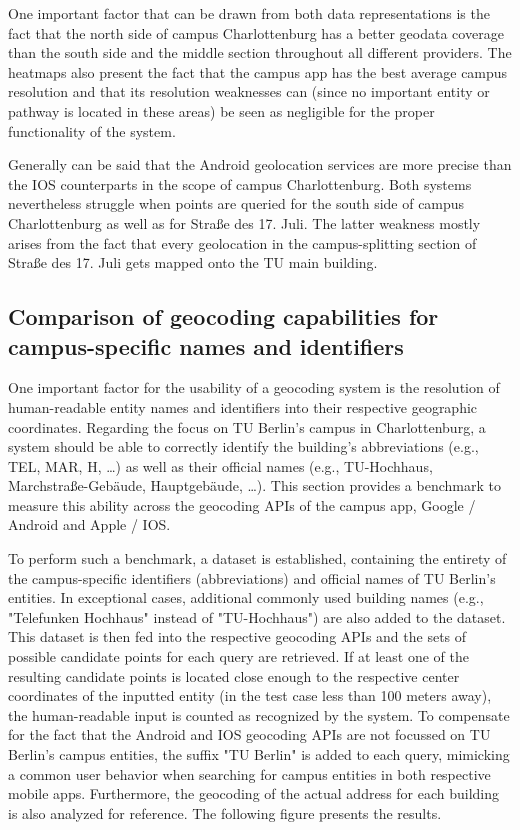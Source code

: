 One important factor that can be drawn from both data representations is the fact that the north side of campus Charlottenburg has a better geodata coverage than the south side and the middle section throughout all different providers. The heatmaps also present the fact that the campus app has the best average campus resolution and that its resolution weaknesses can (since no important entity or pathway is located in these areas) be seen as negligible for the proper functionality of the system.

Generally can be said that the Android geolocation services are more precise than the IOS counterparts in the scope of campus Charlottenburg. Both systems nevertheless struggle when points are queried for the south side of campus Charlottenburg as well as for Straße des 17. Juli. The latter weakness mostly arises from the fact that every geolocation in the campus-splitting section of Straße des 17. Juli gets mapped onto the TU main building.

\subsection{Comparison of geocoding capabilities for campus-specific names and identifiers}
One important factor for the usability of a geocoding system is the resolution of human-readable entity names and identifiers into their respective geographic coordinates. Regarding the focus on TU Berlin's campus in Charlottenburg, a system should be able to correctly identify the building's abbreviations (e.g., TEL, MAR, H, \ldots) as well as their official names (e.g., TU-Hochhaus, Marchstraße-Gebäude, Hauptgebäude, \ldots). This section provides a benchmark to measure this ability across the geocoding APIs of the campus app, Google / Android and Apple / IOS.

To perform such a benchmark, a dataset is established, containing the entirety of the campus-specific identifiers (abbreviations) and official names of TU Berlin's entities. In exceptional cases, additional commonly used building names (e.g., "Telefunken Hochhaus" instead of "TU-Hochhaus") are also added to the dataset. This dataset is then fed into the respective geocoding APIs and the sets of possible candidate points for each query are retrieved. If at least one of the resulting candidate points is located close enough to the respective center coordinates of the inputted entity (in the test case less than 100 meters away), the human-readable input is counted as recognized by the system. To compensate for the fact that the Android and IOS geocoding APIs are not focussed on TU Berlin's campus entities, the suffix "TU Berlin" is added to each query, mimicking a common user behavior when searching for campus entities in both respective mobile apps. Furthermore, the geocoding of the actual address for each building is also analyzed for reference. The following figure presents the results.

